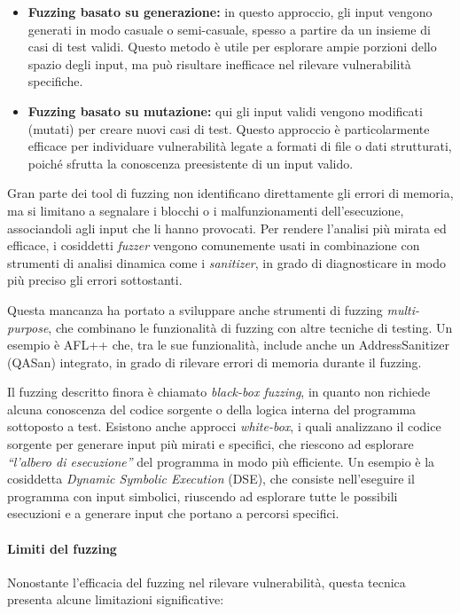 \begin{itemize}
  \item \textbf{Fuzzing basato su generazione:} in questo approccio, gli input vengono
    generati in modo casuale o semi-casuale, spesso a partire da un insieme di
    casi di test validi. Questo metodo è utile per esplorare ampie porzioni dello
    spazio degli input, ma può risultare inefficace nel rilevare vulnerabilità
    specifiche.

  \item \textbf{Fuzzing basato su mutazione:} qui gli input validi vengono
    modificati (mutati) per creare nuovi casi di test. Questo approccio è particolarmente
    efficace per individuare vulnerabilità legate a formati di file o dati strutturati,
    poiché sfrutta la conoscenza preesistente di un input valido.
\end{itemize}

Gran parte dei tool di fuzzing non identificano direttamente gli errori di
memoria, ma si limitano a segnalare i blocchi o i malfunzionamenti dell'esecuzione,
associandoli agli input che li hanno provocati. Per rendere l'analisi più mirata
ed efficace, i cosiddetti \textit{fuzzer} vengono comunemente usati in combinazione
con strumenti di analisi dinamica come i \textit{sanitizer}, in grado di diagnosticare
in modo più preciso gli errori sottostanti.

Questa mancanza ha portato a sviluppare anche strumenti di fuzzing \textit{multi-purpose},
che combinano le funzionalità di fuzzing con altre tecniche di testing. Un
esempio è AFL++\cite{afl_plus_plus} che, tra le sue funzionalità, include anche un
AddressSanitizer (QASan\cite{qasan}) integrato, in grado di rilevare errori di memoria
durante il fuzzing.

Il fuzzing descritto finora è chiamato \textit{black-box fuzzing}, in quanto non
richiede alcuna conoscenza del codice sorgente o della logica interna del programma
sottoposto a test. Esistono anche approcci \textit{white-box}, i quali
analizzano il codice sorgente per generare input più mirati e specifici, che riescono
ad esplorare \textit{``l'albero di esecuzione''} del programma in modo più
efficiente. Un esempio è la cosiddetta \textit{Dynamic Symbolic Execution} (DSE),
che consiste nell'eseguire il programma con input simbolici, riuscendo ad
esplorare tutte le possibili esecuzioni e a generare input che portano a
percorsi specifici.\cite{dynamic_symbolic_execution}

\paragraph{Limiti del fuzzing}
Nonostante l'efficacia del fuzzing nel rilevare vulnerabilità, questa tecnica presenta
alcune limitazioni significative:

